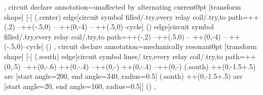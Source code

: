 {{  },
  circuit declare annotation={unaffected by alternating current}{0pt}
  {
    [transform shape]
    [-]
    (\tikzlastnode.center) edge[circuit symbol filled/.try,every relay coil/.try,to path={++(\tikzcircuitssizeunit,2\tikzcircuitssizeunit) --++(-.5\tikzcircuitssizeunit,0) -- ++(0,-4\tikzcircuitssizeunit) -- ++(.5\tikzcircuitssizeunit,0)--cycle}] () edge[circuit symbol filled/.try,every relay coil/.try,to path={++(-\tikzcircuitssizeunit,2\tikzcircuitssizeunit) --++(.5\tikzcircuitssizeunit,0) -- ++(0,-4\tikzcircuitssizeunit) -- ++(-.5\tikzcircuitssizeunit,0)--cycle}] ()
  },
  circuit declare annotation={mechanically resonant}{0pt}
  {
    [transform shape]
    [-]
    (\tikzlastnode.south) edge[circuit symbol lines/.try,every relay coil/.try,to path={++(0,.5\pgflinewidth) --++(0,-.6\tikzcircuitssizeunit) ++(0,-.4\tikzcircuitssizeunit) --++(0,-\tikzcircuitssizeunit) ++(0,-.4\tikzcircuitssizeunit)  --++(0,-\tikzcircuitssizeunit)
    (\tikzlastnode.south) ++(0,-1.5\tikzcircuitssizeunit+.5\pgflinewidth) arc [start angle=200, end angle=340, radius=0.5\tikzcircuitssizeunit]
    (\tikzlastnode.south) ++(0,-1.5\tikzcircuitssizeunit+.5\pgflinewidth) arc [start angle=20, end angle=160, radius=0.5\tikzcircuitssizeunit]}] ()
  },
}

